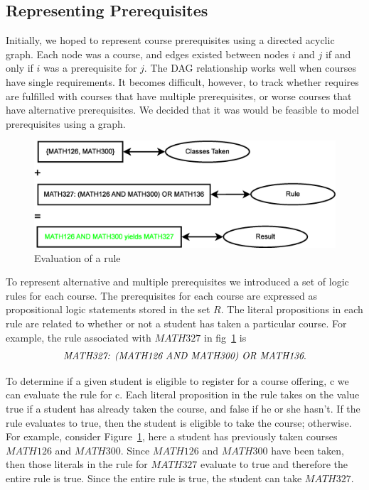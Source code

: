\documentclass[11pt]{article} %
\begin{document}
\subsection{Representing Prerequisites} Initially, we hoped to represent course
prerequisites using a directed acyclic graph. Each node was a course, and edges
existed between nodes $i$ and $j$ if and only if $i$ was a prerequisite for $j$.
The DAG relationship works well when courses have single requirements. It
becomes difficult, however, to track whether requires are fulfilled with courses
that have multiple prerequisites, or worse courses that have alternative
prerequisites. We decided that it was would be feasible to model prerequisites
using a graph.
\begin{figure} [ht] \begin{center}
\includegraphics[scale=0.4]{prereq_logic_example} \end{center}
\caption{Evaluation of a rule} \label{logic_ex} \end{figure}

To represent alternative and multiple prerequisites we introduced a set of logic
rules for each course. The prerequisites for each course are expressed as
propositional logic statements stored in the set $R$. The literal propositions
in each rule are related to whether or not a student has taken a particular
course. For example, the rule associated with $MATH327$ in fig~\ref{logic_ex} is
$$ \text{{\it MATH327: (MATH126 AND MATH300) OR MATH136}}.$$

To determine if a given student is eligible to register for a course offering,
c we can evaluate the rule for c. Each literal proposition in the rule takes on
the value true if a student has already taken the course, and false if he or she
hasn't.  If the rule evaluates to true, then the student is eligible to take the
course; otherwise. For example, consider Figure~\ref{logic_ex}, here a student
has previously taken courses $MATH126$ and $MATH300$. Since $MATH126$ and
$MATH300$ have been taken, then those literals in the rule for $MATH327$
evaluate to true and therefore the entire rule is true.  Since the entire rule
is true, the student can take $MATH327$.
\end{document}
